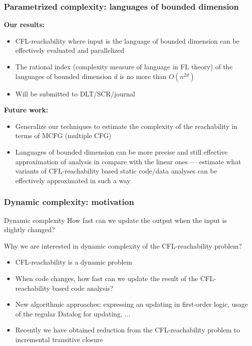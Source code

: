 \documentclass{beamer}
\begin{document}
\begin{frame}
\frametitle{Parametrized complexity: languages of bounded dimension}
\textbf{Our results:}
\begin{itemize}
\item CFL-reachability where input is the language of bounded dimension can be effectively evaluated and parallelized 
\item The rational index (complexity measure of language in FL theory) of the languages of bounded dimension $d$ is no more than $O(n^{2d})$
\item Will be submitted to DLT/SCR/journal
\end{itemize}

\textbf{Future work:}
\begin{itemize}
\item Generalize our techniques to estimate the complexity of the reachability in terms of MCFG (multiple CFG)
\item Languages of bounded dimension can be more precise and still effective approximation of analysis in compare with the linear ones --- estimate what variants of CFL-reachability based static code/data analyses can be effectively approximated in such a way
\end{itemize}
\end{frame}
\begin{frame}
\frametitle{Dynamic complexity: motivation}
\begin{block}{Dynamic complexity}
How fast can we update the output when the input is slightly changed?
\end{block}
Why we are interested in dynamic complexity of the CFL-reachability problem?

\begin{itemize}
\item CFL-reachability is a dynamic problem
\item When code changes, how fast can we update the result of the CFL-reachability based code analysis?
\item New algorithmic approaches: expressing an updating in first-order logic, usage of the regular Datalog for updating, ...
\item Recently we have obtained reduction from the CFL-reachability problem to incremental transitive closure
\end{itemize}


\end{frame}
\end{document}
